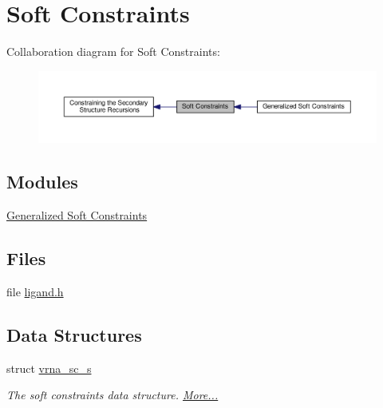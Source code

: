 \hypertarget{group__soft__constraints}{\section{Soft Constraints}
\label{group__soft__constraints}
}
Collaboration diagram for Soft Constraints\+:
\nopagebreak
\begin{figure}[H]
\begin{center}
\leavevmode
\includegraphics[width=350pt]{group__soft__constraints}
\end{center}
\end{figure}
\subsection*{Modules}
\begin{DoxyCompactItemize}
\item 
\hyperlink{group__generalized__sc}{Generalized Soft Constraints}
\end{DoxyCompactItemize}
\subsection*{Files}
\begin{DoxyCompactItemize}
\item 
file \hyperlink{ligand_8h}{ligand.\+h}
\end{DoxyCompactItemize}
\subsection*{Data Structures}
\begin{DoxyCompactItemize}
\item 
struct \hyperlink{group__soft__constraints_structvrna__sc__s}{vrna\+\_\+sc\+\_\+s}
\begin{DoxyCompactList}\small\item\em The soft constraints data structure.  \hyperlink{group__soft__constraints_structvrna__sc__s}{More...}\end{DoxyCompactList}\end{DoxyCompactItemize}
